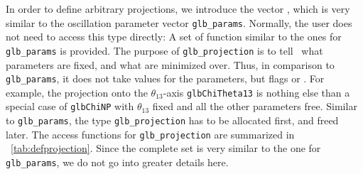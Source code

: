 In order to define arbitrary projections, we introduce the vector
, which is very similar to the
oscillation parameter vector {\tt glb\_params}.
Normally, the user does not need to access this type directly:
A set of function similar to the ones for {\tt glb\_params} is
provided. The purpose of {\tt glb\_projection} is to tell \GLOBES\ 
what parameters are fixed, and what are minimized over. Thus, in
comparison to {\tt glb\_params}, it does not take values for the
parameters, but flags \GLBC{GLB\_FIXED} or \GLBC{GLB\_FREE}.
For example, the projection onto the $\theta_{13}$-axis {\tt glbChiTheta13}
is nothing else than a special case of {\tt glbChiNP} with $\theta_{13}$
fixed and all the other parameters free. Similar to {\tt glb\_params},
the type {\tt glb\_projection} has to be allocated first, and freed
later. The access functions for {\tt glb\_projection} are summarized in \Tab~\ref{tab:defprojection}. Since the complete set is very similar to
the one for {\tt glb\_params}, we do not go into greater details here.

